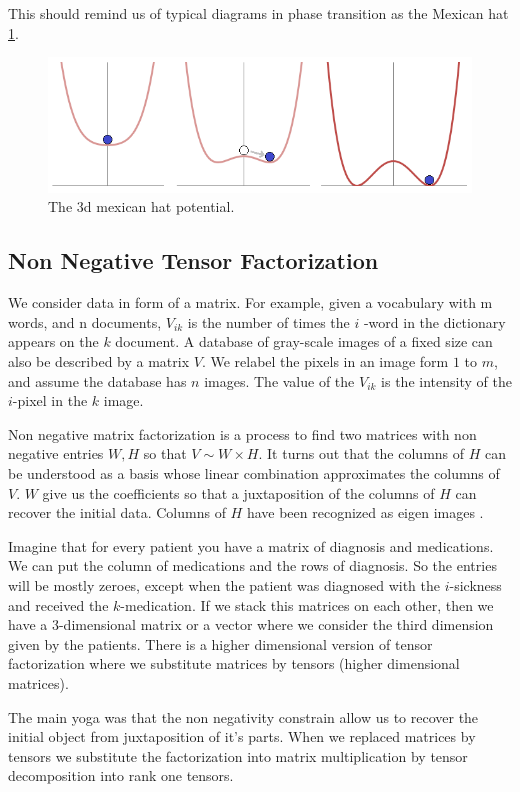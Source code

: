 \documentclass[11pt,letterpaper]{report}
\begin{document}
This should remind us of  typical diagrams in phase transition as the Mexican hat \ref{fig:face}.
 \begin{figure}[h!]
	\centering
	\includegraphics[width=0.45\linewidth]{figures/image.png}
	\caption{The 3d mexican hat potential.} 
	\label{fig:face}
\end{figure} 	




 \subsection{Non Negative Tensor Factorization}
 
We consider data in form of a matrix. For example, given a vocabulary with  m  words, and  n  documents,  $V_{ik}$ is  the number of times the  $i$ -word in the dictionary appears on the  $k$  document.
A database of gray-scale images of a fixed size can also be described by a matrix $V$.  We relabel the pixels in an image form $1$ to $ m$, and assume the  database has $n$ images. The value of the $V_{ik}$ is the intensity of the $i$-pixel in the $k$ image. 

Non negative matrix factorization is a process to find two matrices with non negative entries $W,H$ so that $V\sim W\times H$. It turns out that the columns of $H$ can be understood as a basis whose linear combination approximates the columns of $V$. $W$ give us the coefficients so that a juxtaposition of the columns of  $H$ can recover the initial data. Columns of $H$ have been recognized as eigen images \cite{Lee1999}.  
 
 

Imagine that for every patient you have a matrix of diagnosis and medications. We can put the column of medications and the rows of diagnosis. So the entries will be mostly zeroes, except when the patient was diagnosed with the $i$-sickness and received the $k$-medication. If we stack this matrices on each other, then we have a 3-dimensional matrix or a vector where we consider the third dimension given by the patients. There is a higher dimensional version of tensor factorization  where we substitute  matrices by tensors (higher dimensional matrices). 
 
The main yoga was that the non negativity constrain allow us to recover the initial object from juxtaposition of it's parts. When we  replaced matrices by tensors we substitute the factorization into matrix multiplication by tensor decomposition into rank one tensors. 
 
\end{document}
